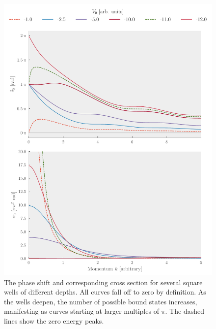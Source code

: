 \begin{figure}[hp]
  \centering
  \includegraphics[]{Figures/square_well_wave.pdf}
  \caption{\label{fig:squarewellwave}The phase shift and corresponding cross
    section for several square wells of different depths. All curves fall off to
    zero by definition. As the wells deepen,
    the number of possible bound states increases, manifesting as curves
    starting at larger multiples of \(\pi\). The dashed lines show the zero energy peaks.}
\end{figure}

